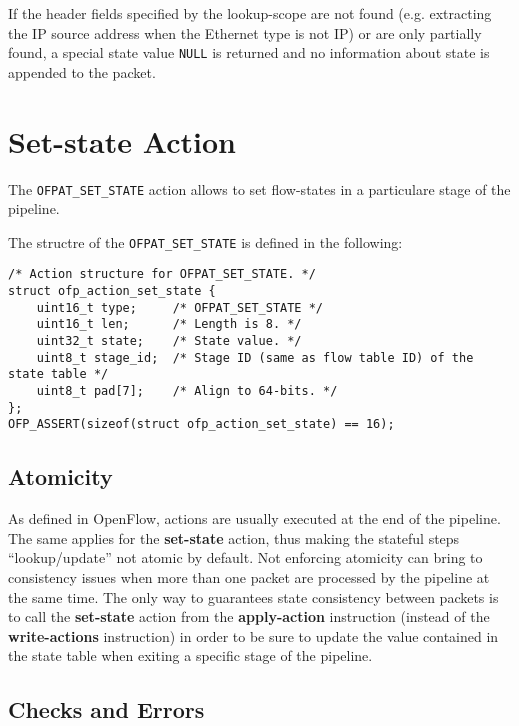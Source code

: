 If the header fields specified by the lookup-scope are not found (e.g. extracting the IP source address when the Ethernet type is not IP) or are only partially found, a special state value \texttt{NULL} is returned and no information about state is appended to the packet.

\section{Set-state Action}
\label{sec:act_set_state}

The \texttt{OFPAT\_SET\_STATE} action allows to set flow-states in a particulare stage of the pipeline.

The structre of the \texttt{OFPAT\_SET\_STATE} is defined in the following:

\begin{verbatim}
/* Action structure for OFPAT_SET_STATE. */
struct ofp_action_set_state {
    uint16_t type;     /* OFPAT_SET_STATE */
    uint16_t len;      /* Length is 8. */
    uint32_t state;    /* State value. */
    uint8_t stage_id;  /* Stage ID (same as flow table ID) of the state table */
    uint8_t pad[7];    /* Align to 64-bits. */
};
OFP_ASSERT(sizeof(struct ofp_action_set_state) == 16);
\end{verbatim}


\subsection{Atomicity}
As defined in OpenFlow, actions are usually executed at the end of the pipeline. The same applies for the \textbf{set-state} action, thus making the stateful steps ``lookup/update'' not atomic by default. Not enforcing atomicity can bring to consistency issues when more than one packet are processed by the pipeline at the same time. The only way to guarantees state consistency between packets is to call the \textbf{set-state} action from the \textbf{apply-action} instruction (instead of the \textbf{write-actions} instruction) in order to be sure to update the value contained in the state table when exiting a specific stage of the pipeline.

\subsection{Checks and Errors}


